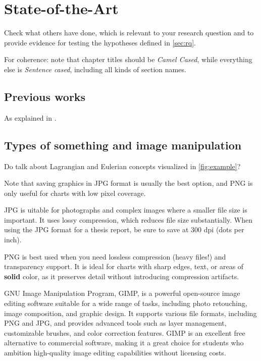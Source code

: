 \chapter{State-of-the-Art}
\label{ch:soa}


Check what others have done, which is relevant to your research question and to provide evidence for testing the hypotheses defined in \autoref{sec:rq}.

For coherence: note that chapter titles should be \textit{Camel Cased}, while everything else is \textit{Sentence cased}, including all kinds of section names.

\section{Previous works}
\label{sec:prevworks}
	
As explained in .
	
	
\section{Types of something and image manipulation}
\label{sec:typesome}

Do  talk about Lagrangian and Eulerian concepts visualized in \autoref{fig:example}?

Note that saving graphics in JPG format is usually the best option, and PNG is only useful for charts with low pixel coverage.

JPG is uitable for photographs and complex images where a smaller file size is important. It uses lossy compression, which reduces file size substantially. When using the JPG format for a thesis report, be sure to save at 300 dpi (dots per inch).

PNG is best used when you need lossless compression (heavy files!) and transparency support. It is ideal for charts with sharp edges, text, or areas of \textbf{solid} color, as it preserves detail without introducing compression artifacts.

GNU Image Manipulation Program, GIMP, is a powerful open-source image editing software suitable for a wide range of tasks, including photo retouching, image composition, and graphic design. It supports various file formats, including PNG and JPG, and provides advanced tools such as layer management, customizable brushes, and color correction features. GIMP is an excellent free alternative to commercial software, making it a great choice for students who ambition high-quality image editing capabilities without licensing costs.


